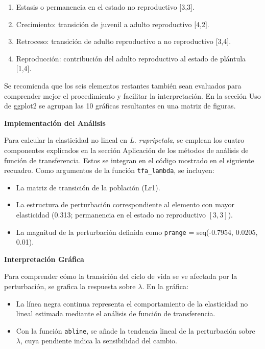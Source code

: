 \documentclass[
  12pt,
  letterpaper,
]{book}
\providecommand{\tightlist}{%
  \setlength{\itemsep}{0pt}\setlength{\parskip}{0pt}}\usepackage{longtable,booktabs,array}
\begin{document}
\begin{enumerate}
\def\labelenumi{\alph{enumi})}
\tightlist
\item
  Estasis o permanencia en el estado no reproductivo {[}3,3{]}.
\item
  Crecimiento: transición de juvenil a adulto reproductivo {[}4,2{]}.
\item
  Retroceso: transición de adulto reproductivo a no reproductivo
  {[}3,4{]}.
\item
  Reproducción: contribución del adulto reproductivo al estado de
  plántula {[}1,4{]}.
\end{enumerate}

Se recomienda que los seis elementos restantes también sean evaluados
para comprender mejor el procedimiento y facilitar la interpretación. En
la sección Uso de ggplot2 se agrupan las 10 gráficas resultantes en una
matriz de figuras.

\textbf{Implementación del Análisis}

Para calcular la elasticidad no lineal en \emph{L. rupripetala}, se
emplean los cuatro componentes explicados en la sección Aplicación de
los métodos de análisis de función de transferencia. Estos se integran
en el código mostrado en el siguiente recuadro. Como argumentos de la
función \texttt{tfa\_lambda}, se incluyen:

\begin{itemize}
\tightlist
\item
  La matriz de transición de la población (Lr1).
\item
  La estructura de perturbación correspondiente al elemento con mayor
  elasticidad (0.313; permanencia en el estado no reproductivo
  \([3,3]\)).
\item
  La magnitud de la perturbación definida como \texttt{prange} =
  seq(-0.7954, 0.0205, 0.01).
\end{itemize}

\textbf{Interpretación Gráfica}

Para comprender cómo la transición del ciclo de vida se ve afectada por
la perturbación, se grafica la respuesta sobre \(\lambda\). En la
gráfica:

\begin{itemize}
\item
  La línea negra continua representa el comportamiento de la elasticidad
  no lineal estimada mediante el análisis de función de transferencia.
\item
  Con la función \texttt{abline}, se añade la tendencia lineal de la
  perturbación sobre \(\lambda\), cuya pendiente indica la sensibilidad
  del cambio.
\end{itemize}
\end{document}
